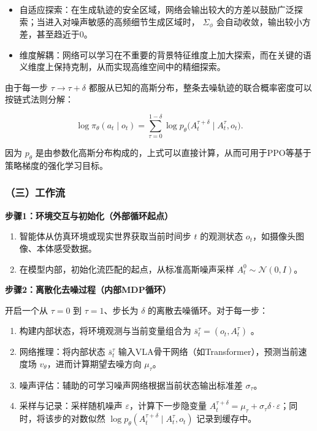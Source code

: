 \begin{itemize}
\tightlist
\item
  自适应探索：在生成轨迹的安全区域，网络会输出较大的方差以鼓励广泛探索；当进入对噪声敏感的高频细节生成区域时， \(\Sigma_\phi\) 会自动收敛，输出较小方差，甚至趋近于0。
\item
  维度解耦：网络可以学习在不重要的背景特征维度上加大探索，而在关键的语义维度上保持克制，从而实现高维空间中的精细探索。
\end{itemize}

由于每一步 \(\tau\to\tau+\delta\) 都服从已知的高斯分布，整条去噪轨迹的联合概率密度可以按链式法则分解：

\[
\log\pi_\theta(a_t\mid o_t)=\sum_{\tau=0}^{1-\delta}\log p_\theta
\bigl(A_t^{\tau+\delta}\mid A_t^\tau,o_t\bigr).
\]

因为 \(p_\theta\) 是由参数化高斯分布构成的，上式可以直接计算，从而可用于PPO等基于策略梯度的强化学习目标。

\hypertarget{ux4e09ux5de5ux4f5cux6d41}{%
\subsubsection{（三）工作流}\label{ux4e09ux5de5ux4f5cux6d41}}

\textbf{步骤1：环境交互与初始化（外部循环起点）}

\begin{enumerate}
\def\labelenumi{\arabic{enumi}.}
\tightlist
\item
  智能体从仿真环境或现实世界获取当前时间步 \(t\) 的观测状态 \(o_t\)，如摄像头图像、本体感受数据。
\item
  在模型内部，初始化流匹配的起点，从标准高斯噪声采样 \(A_t^0\sim\mathcal{N}(0,I)\)。
\end{enumerate}

\textbf{步骤2：离散化去噪过程（内部MDP循环）}

开启一个从 \(\tau=0\) 到 \(\tau=1\)、步长为 \(\delta\) 的离散去噪循环。对于每一步：

\begin{enumerate}
\def\labelenumi{\arabic{enumi}.}
\tightlist
\item
  构建内部状态，将环境观测与当前变量组合为 \(\bar{s}_t^\tau=(o_t,A_t^\tau)\) 。
\item
  网络推理：将内部状态 \(\bar{s}_t^\tau\) 输入VLA骨干网络（如Transformer），预测当前速度场 \(v_\theta\)，进而计算期望去噪方向 \(\mu_\tau\)。
\item
  噪声评估：辅助的可学习噪声网络根据当前状态输出标准差 \(\sigma_\tau\)。
\item
  采样与记录：采样随机噪声 \(\varepsilon\)，计算下一步隐变量 \(A_t^{\tau+\delta}=\mu_\tau+\sigma_\tau\delta\cdot\varepsilon\)；同时，将该步的对数似然 \(\log p_\theta(A_t^{\tau+\delta}\mid A_t^\tau,o_t)\) 记录到缓存中。
\end{enumerate}

